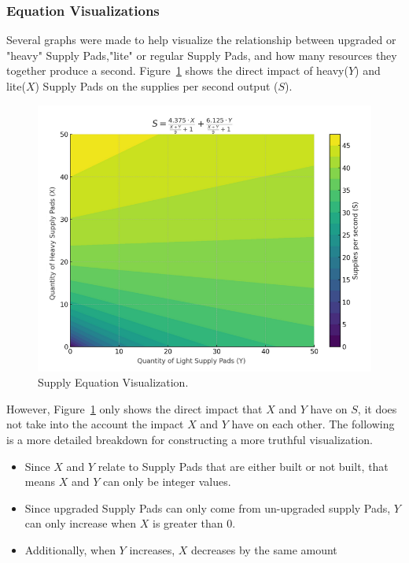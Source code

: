 \documentclass[a4paper, 12pt, english]{article}
\begin{document}
\subsubsection{Equation Visualizations}
Several graphs were made to help visualize the relationship between upgraded or "heavy" Supply Pads,"lite" or regular Supply Pads, and how many resources they together produce a second. Figure~\ref{fig:EquationVisualization} shows the direct impact of heavy($Y$) and lite($X$) Supply Pads on the supplies per second output ($S$).
\newline

 \begin{figure}[!ht]
 			\begin{center}
				\includegraphics[width=150mm,scale=1.0]{SupplyPadGraph.png}
			\end{center}
       		\caption{\label{fig:EquationVisualization}Supply Equation Visualization.}
 \end{figure}


However, Figure~\ref{fig:EquationVisualization} only shows the direct impact that $X$ and $Y$ have on $S$, it does not take into the account the impact $X$ and $Y$ have on each other. The following is a more detailed breakdown for constructing a more truthful visualization.

\begin{itemize}
    \item Since $X$ and $Y$ relate to Supply Pads that are either built or not built, that means $X$ and $Y$ can only be integer values.
    \item Since upgraded Supply Pads can only come from un-upgraded supply Pads, $Y$ can only increase when $X$ is greater than 0.
    \item Additionally, when $Y$ increases, $X$ decreases by  the same amount
\end{itemize}
\end{document}

